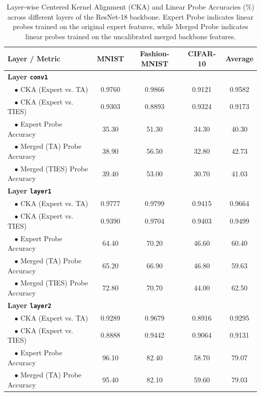 \documentclass{article}
\theoremstyle{plain}
\theoremstyle{definition}
\theoremstyle{remark}
\begin{document}
\begin{table}[t]
  \caption{Layer-wise Centered Kernel Alignment (CKA) and Linear Probe Accuracies (\%) across different layers of the ResNet-18 backbone. Expert Probe indicates linear probes trained on the original expert features, while Merged Probe indicates linear probes trained on the uncalibrated merged backbone features.}
  \label{tab:layerwise_metrics}
  \centering
  \scriptsize
  \renewcommand{\arraystretch}{0.85}
  \begin{tabular}{lcccc}
    \toprule
    \textbf{Layer / Metric} & \textbf{MNIST} & \textbf{Fashion-MNIST} & \textbf{CIFAR-10} & \textbf{Average} \\
    \midrule
    \textbf{Layer \texttt{conv1}} & & & & \\
    ~~$\bullet$ CKA (Expert vs. TA) & 0.9760 & 0.9866 & 0.9121 & 0.9582 \\
    ~~$\bullet$ CKA (Expert vs. TIES) & 0.9303 & 0.8893 & 0.9324 & 0.9173 \\
    ~~$\bullet$ Expert Probe Accuracy & 35.30 & 51.30 & 34.30 & 40.30 \\
    ~~$\bullet$ Merged (TA) Probe Accuracy & 38.90 & 56.50 & 32.80 & 42.73 \\
    ~~$\bullet$ Merged (TIES) Probe Accuracy & 39.40 & 53.00 & 30.70 & 41.03 \\
    \midrule
    \textbf{Layer \texttt{layer1}} & & & & \\
    ~~$\bullet$ CKA (Expert vs. TA) & 0.9777 & 0.9799 & 0.9415 & 0.9664 \\
    ~~$\bullet$ CKA (Expert vs. TIES) & 0.9390 & 0.9704 & 0.9403 & 0.9499 \\
    ~~$\bullet$ Expert Probe Accuracy & 64.40 & 70.20 & 46.60 & 60.40 \\
    ~~$\bullet$ Merged (TA) Probe Accuracy & 65.20 & 66.90 & 46.80 & 59.63 \\
    ~~$\bullet$ Merged (TIES) Probe Accuracy & 72.80 & 70.70 & 44.00 & 62.50 \\
    \midrule
    \textbf{Layer \texttt{layer2}} & & & & \\
    ~~$\bullet$ CKA (Expert vs. TA) & 0.9289 & 0.9679 & 0.8916 & 0.9295 \\
    ~~$\bullet$ CKA (Expert vs. TIES) & 0.8888 & 0.9442 & 0.9064 & 0.9131 \\
    ~~$\bullet$ Expert Probe Accuracy & 96.10 & 82.40 & 58.70 & 79.07 \\
    ~~$\bullet$ Merged (TA) Probe Accuracy & 95.40 & 82.10 & 59.60 & 79.03 \\

\end{tabular}
\end{table}
\end{document}
